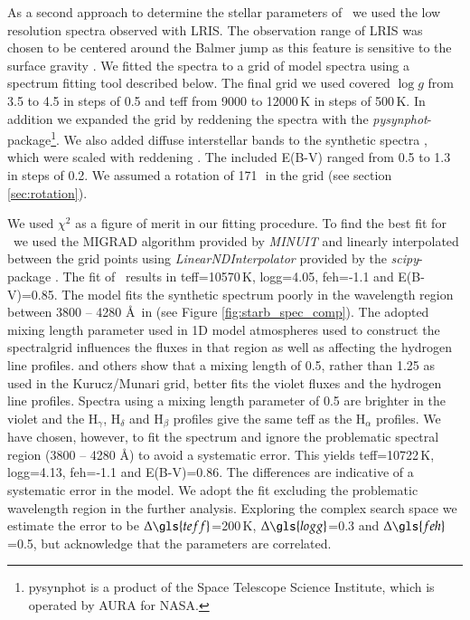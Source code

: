 As a second approach to determine the stellar parameters of \starb\ we used the low resolution spectra observed with LRIS.  The observation range of LRIS was chosen to be centered around the Balmer jump as this feature is sensitive to the surface gravity \citep{2007PASP..119..605B}. We fitted the spectra to a grid of model spectra \citep[]{2005A&A...442.1127M} using a spectrum fitting tool  described below. The final grid we used covered $\log{g}$ from 3.5 to 4.5 in steps of 0.5 and \gls{teff} from 9000 to 12000\,K in steps of 500\,K. In addition we expanded the grid by reddening the spectra with the \textit{pysynphot}-package\footnote{pysynphot is a product of the Space Telescope Science Institute, which is operated by AURA for NASA.}. We also added diffuse interstellar bands  \citep{1937PASP...49..224B, 1966ZA.....64..512H, 1967IAUS...31...85H, 1975ApJ...196..129H, 1995ARA&A..33...19H, 1994dib..nasa...31H, 1994A&AS..106...39J, 1958ApJ...128...57W} to the synthetic spectra , which were scaled with reddening . The included E(B-V) ranged from 0.5 to 1.3 in steps of 0.2. We assumed a rotation of 171\,\kms\ in the grid  (see section \ref{sec:rotation}).

We used $\chi^2$ as a figure of merit in our fitting procedure. To find the best fit for \starb\ we used the MIGRAD algorithm provided by \textit{MINUIT} \citep{James:1975dr} and linearly interpolated between the grid points using \textit{LinearNDInterpolator} provided by the \textit{scipy}-package  \cite{Jones:2001fk}. The fit of \starb\ results in \gls{teff}=10570\,\textrm{K}, \gls{logg}=4.05, \gls{feh}=-1.1 and E(B-V)=0.85. The model fits the synthetic spectrum poorly  in the wavelength region between 3800 -- 4280 \AA\ in (see Figure \ref{fig:starb_spec_comp}). The adopted mixing length parameter used in 1D model atmospheres used to construct the spectralgrid influences the fluxes in that region as well as affecting the hydrogen line profiles. \citet{2002A&A...392..619H} and others show that a mixing length of 0.5, rather than 1.25 as used in the Kurucz/Munari grid, better fits the violet fluxes and the hydrogen line profiles. Spectra using a mixing length parameter of 0.5 are brighter in the violet and the $\textrm{H}_\gamma$, $\textrm{H}_\delta$ and $\textrm{H}_\beta$ profiles give the same \gls{teff} as the $\textrm{H}_\alpha$ profiles. We have chosen, however, to fit the spectrum and ignore the problematic spectral region (3800 -- 4280 \AA) to avoid a systematic error. This yields \gls{teff}=10722\,K, \gls{logg}=4.13, \gls{feh}=-1.1 and E(B-V)=0.86. The differences are indicative of a systematic error in the model. We adopt the fit excluding the problematic wavelength region in the further analysis. Exploring the complex search space we estimate the error to be $\Delta\gls{teff}$=200\,K, $\Delta\gls{logg}$=0.3 and $\Delta\gls{feh}$=0.5, but acknowledge that the parameters are correlated.  



